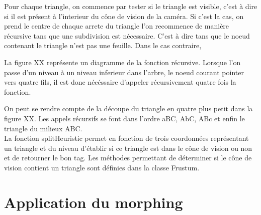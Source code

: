 \documentclass[12pt]{report}
\begin{document}
	Pour chaque triangle, on commence par tester si le triangle est visible, c'est à dire si il est
	présent à l'interieur du cône de vision de la caméra. Si c'est la cas, on prend le centre de chaque
	arrete du triangle l'on recommence de manière récursive tans que une subdivision est nécessaire.
	C'est à dire tans que le noeud contenant le triangle n'est pas une feuille. Dans le cas contraire,
	
	
	La figure XX représente un diagramme de la fonction récursive. Lorsque l'on passe d'un niveau à un
	niveau inferieur dans l'arbre, le noeud courant pointer vers quatre fils, il est donc nécéssaire
	d'appeler récursivement quatre fois la fonction.
	
	On peut se rendre compte de la découpe du triangle en quatre plus petit dans la figure XX.
	Les appels récursifs se font dans l'ordre aBC, AbC, ABc et enfin le triangle du milieux ABC.\\
	
	La fonction splitHeuristic permet en fonction de trois coordonnées représentant un triangle 
	et du niveau d'établir si ce triangle est dans le cône de vision ou non et de retourner le bon tag.
	Les méthodes permettant de déterminer si le cône de vision contient un triangle sont définies dans
	la classe Frustum.
	
  \section{Application du morphing}

  

  
  
  
  
  
\end{document}
